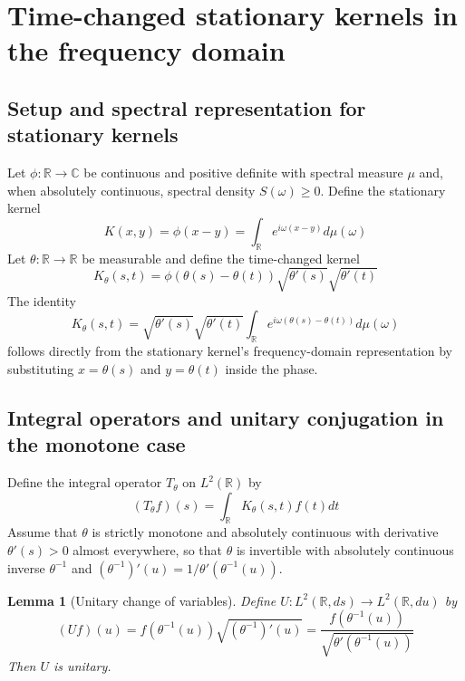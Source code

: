 \documentclass{article}
\newtheorem{lemma}{Lemma}
\begin{document}
\section{Time-changed stationary kernels in the frequency domain}

\subsection{Setup and spectral representation for stationary kernels}

Let $\phi : \mathbb{R} \to \mathbb{C}$ be continuous and positive definite
with spectral measure $\mu$ and, when absolutely continuous, spectral density
$S (\omega) \ge 0$. Define the stationary kernel
\begin{equation}
  K (x, y) = \phi (x - y) = \int_{\mathbb{R}} e^{i \omega (x - y)} d \mu
  (\omega)
\end{equation}
Let $\theta : \mathbb{R} \to \mathbb{R}$ be measurable and define the
time-changed kernel
\begin{equation}
  K_{\theta} (s, t) = \phi (\theta (s) - \theta (t))  \sqrt{\theta' (s)} 
  \sqrt{\theta' (t)}
\end{equation}
The identity
\begin{equation}
  K_{\theta} (s, t) = \sqrt{\theta' (s)}  \sqrt{\theta' (t)} 
  \int_{\mathbb{R}} e^{i \omega (\theta (s) - \theta (t))} d \mu (\omega)
\end{equation}
follows directly from the stationary kernel's frequency-domain representation
by substituting $x = \theta (s)$ and $y = \theta (t)$ inside the phase.

\subsection{Integral operators and unitary conjugation in the monotone case}

Define the integral operator $T_{\theta}$ on $L^2 (\mathbb{R})$ by
\begin{equation}
  (T_{\theta} f) (s) = \int_{\mathbb{R}} K_{\theta} (s, t) f (t) dt
\end{equation}
Assume that $\theta$ is strictly monotone and absolutely continuous with
derivative $\theta' (s) > 0$ almost everywhere, so that $\theta$ is invertible
with absolutely continuous inverse $\theta^{- 1}$ and $(\theta^{- 1})' (u) = 1
/ \theta' (\theta^{- 1} (u))$.

\begin{lemma}[Unitary change of variables]
  Define $U : L^2 (\mathbb{R}, ds) \to L^2 (\mathbb{R}, du)$ by
  \begin{equation}
    (Uf) (u) = f (\theta^{- 1} (u)) \sqrt{(\theta^{- 1})' (u)} = \frac{f
    (\theta^{- 1} (u))}{\sqrt{\theta' (\theta^{- 1} (u))}}
  \end{equation}
  Then $U$ is unitary.
\end{lemma}
\end{document}
